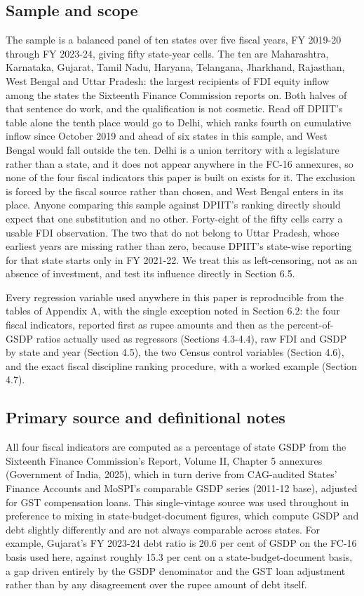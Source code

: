 \documentclass[12pt,a4paper]{article}
\begin{document}
\subsection{Sample and scope}

The sample is a balanced panel of ten states over five fiscal years, FY 2019-20 through FY 2023-24, giving fifty state-year cells. The ten are Maharashtra, Karnataka, Gujarat, Tamil Nadu, Haryana, Telangana, Jharkhand, Rajasthan, West Bengal and Uttar Pradesh: the largest recipients of FDI equity inflow among the states the Sixteenth Finance Commission reports on. Both halves of that sentence do work, and the qualification is not cosmetic. Read off DPIIT's table alone the tenth place would go to Delhi, which ranks fourth on cumulative inflow since October 2019 and ahead of six states in this sample, and West Bengal would fall outside the ten. Delhi is a union territory with a legislature rather than a state, and it does not appear anywhere in the FC-16 annexures, so none of the four fiscal indicators this paper is built on exists for it. The exclusion is forced by the fiscal source rather than chosen, and West Bengal enters in its place. Anyone comparing this sample against DPIIT's ranking directly should expect that one substitution and no other. Forty-eight of the fifty cells carry a usable FDI observation. The two that do not belong to Uttar Pradesh, whose earliest years are missing rather than zero, because DPIIT's state-wise reporting for that state starts only in FY 2021-22. We treat this as left-censoring, not as an absence of investment, and test its influence directly in Section 6.5.

Every regression variable used anywhere in this paper is reproducible from the tables of Appendix A, with the single exception noted in Section 6.2: the four fiscal indicators, reported first as rupee amounts and then as the percent-of-GSDP ratios actually used as regressors (Sections 4.3-4.4), raw FDI and GSDP by state and year (Section 4.5), the two Census control variables (Section 4.6), and the exact fiscal discipline ranking procedure, with a worked example (Section 4.7).

\subsection{Primary source and definitional notes}

All four fiscal indicators are computed as a percentage of state GSDP from the Sixteenth Finance Commission's Report, Volume II, Chapter 5 annexures (Government of India, 2025), which in turn derive from CAG-audited States' Finance Accounts and MoSPI's comparable GSDP series (2011-12 base), adjusted for GST compensation loans. This single-vintage source was used throughout in preference to mixing in state-budget-document figures, which compute GSDP and debt slightly differently and are not always comparable across states. For example, Gujarat's FY 2023-24 debt ratio is 20.6 per cent of GSDP on the FC-16 basis used here, against roughly 15.3 per cent on a state-budget-document basis, a gap driven entirely by the GSDP denominator and the GST loan adjustment rather than by any disagreement over the rupee amount of debt itself.
\end{document}
